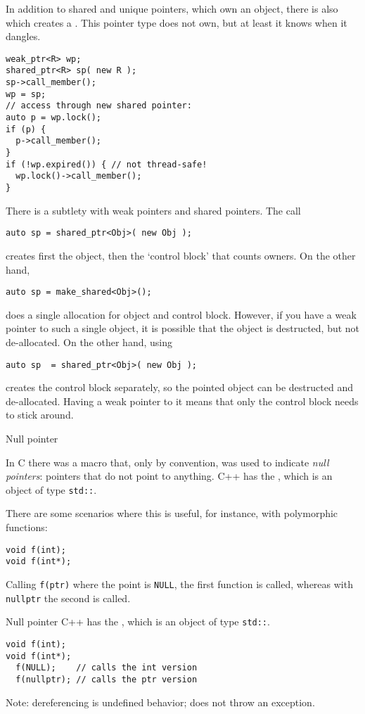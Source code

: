 In addition to shared and unique pointers, which own an object, there
is also  which creates a
. This pointer type does not own, but
at least it knows when it dangles.

\begin{lstlisting}
weak_ptr<R> wp;
shared_ptr<R> sp( new R );
sp->call_member();
wp = sp;
// access through new shared pointer:
auto p = wp.lock();
if (p) {
  p->call_member();
}
if (!wp.expired()) { // not thread-safe!
  wp.lock()->call_member();
}
\end{lstlisting}

There is a subtlety with weak pointers and shared pointers. The call
\begin{lstlisting}
auto sp = shared_ptr<Obj>( new Obj );
\end{lstlisting}
creates first the object, then the `control block' that counts owners.
On the other hand,
\begin{lstlisting}
auto sp = make_shared<Obj>();
\end{lstlisting}
does a single allocation for object and control block. However, if you
have a weak pointer to such a single object, it is possible that the
object is destructed, but not de-allocated. On the other hand, using
\begin{lstlisting}
auto sp  = shared_ptr<Obj>( new Obj );
\end{lstlisting}
creates the control block separately, so the pointed object can be
destructed and de-allocated. Having a weak pointer to it means that only
the control block needs to stick around.

 {Null pointer}

In C there was a macro  that, only by convention, was
used to indicate
\emph{null pointers}:
pointers that do not point to anything.
C++ has the , which is an object of type
\lstinline{std::}.

There are some scenarios where this is useful, for instance, with
polymorphic functions:
\begin{lstlisting}
void f(int);
void f(int*);
\end{lstlisting}
Calling \lstinline{f(ptr)} where the point is \lstinline{NULL}, the first function is
called, whereas with \lstinline{nullptr} the second is called.

\begin{slide}{Null pointer}
  \label{sl:cpp-nullptr}
  C++ has the , which is an object of type
  \lstinline{std::}.

\begin{lstlisting}
void f(int);
void f(int*);
  f(NULL);    // calls the int version
  f(nullptr); // calls the ptr version
\end{lstlisting}
Note: dereferencing is undefined behavior; does not throw an exception.
\end{slide}

